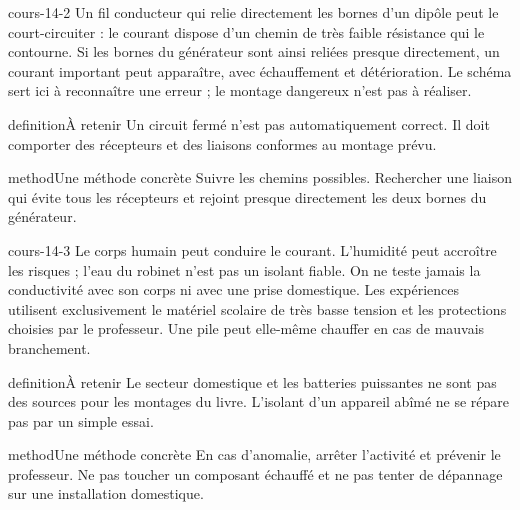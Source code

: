 \documentclass[12pt,twoside,openany]{book}
\begin{document}
\begin{pcFiche}{cours-14-2}
Un fil conducteur qui relie directement les bornes d’un dipôle peut le court-circuiter : le courant dispose d’un chemin de très faible résistance qui le contourne. Si les bornes du générateur sont ainsi reliées presque directement, un courant important peut apparaître, avec échauffement et détérioration. Le schéma sert ici à reconnaître une erreur ; le montage dangereux n’est pas à réaliser.\par
{}
\begin{pcEncadre}{definition}{À retenir}
Un circuit fermé n’est pas automatiquement correct. Il doit comporter des récepteurs et des liaisons conformes au montage prévu.\par
\end{pcEncadre}
\begin{pcEncadre}{method}{Une méthode concrète}
Suivre les chemins possibles. Rechercher une liaison qui évite tous les récepteurs et rejoint presque directement les deux bornes du générateur.\par
\end{pcEncadre}
\end{pcFiche}
\label{ch-14-cours-3}
\begin{pcFiche}{cours-14-3}
Le corps humain peut conduire le courant. L’humidité peut accroître les risques ; l’eau du robinet n’est pas un isolant fiable. On ne teste jamais la conductivité avec son corps ni avec une prise domestique. Les expériences utilisent exclusivement le matériel scolaire de très basse tension et les protections choisies par le professeur. Une pile peut elle-même chauffer en cas de mauvais branchement.\par
{}
\begin{pcEncadre}{definition}{À retenir}
Le secteur domestique et les batteries puissantes ne sont pas des sources pour les montages du livre. L’isolant d’un appareil abîmé ne se répare pas par un simple essai.\par
\end{pcEncadre}
\begin{pcEncadre}{method}{Une méthode concrète}
En cas d’anomalie, arrêter l’activité et prévenir le professeur. Ne pas toucher un composant échauffé et ne pas tenter de dépannage sur une installation domestique.\par
\end{pcEncadre}
\end{pcFiche}
\end{document}
